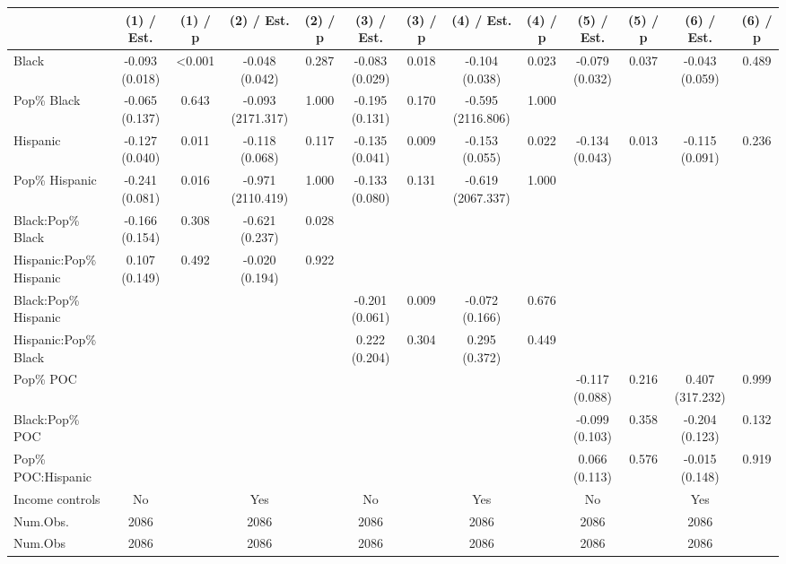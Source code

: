 
\begin{tabular}[t]{lcccccccccccc}
\toprule
  & (1) / Est. & (1) / p & (2) / Est. & (2) / p & (3) / Est. & (3) / p & (4) / Est. & (4) / p & (5) / Est. & (5) / p & (6) / Est. & (6) / p\\
\midrule
Black & -0.093 
(0.018) & <0.001 & -0.048 
(0.042) & 0.287 & -0.083 
(0.029) & 0.018 & -0.104 
(0.038) & 0.023 & -0.079 
(0.032) & 0.037 & -0.043 
(0.059) & 0.489\\
Pop\% Black & -0.065 
(0.137) & 0.643 & -0.093 
(2171.317) & 1.000 & -0.195 
(0.131) & 0.170 & -0.595 
(2116.806) & 1.000 &  &  &  & \\
Hispanic & -0.127 
(0.040) & 0.011 & -0.118 
(0.068) & 0.117 & -0.135 
(0.041) & 0.009 & -0.153 
(0.055) & 0.022 & -0.134 
(0.043) & 0.013 & -0.115 
(0.091) & 0.236\\
Pop\% Hispanic & -0.241 
(0.081) & 0.016 & -0.971 
(2110.419) & 1.000 & -0.133 
(0.080) & 0.131 & -0.619 
(2067.337) & 1.000 &  &  &  & \\
Black:Pop\% Black & -0.166 
(0.154) & 0.308 & -0.621 
(0.237) & 0.028 &  &  &  &  &  &  &  & \\
Hispanic:Pop\% Hispanic & 0.107 
(0.149) & 0.492 & -0.020 
(0.194) & 0.922 &  &  &  &  &  &  &  & \\
Black:Pop\% Hispanic &  &  &  &  & -0.201 
(0.061) & 0.009 & -0.072 
(0.166) & 0.676 &  &  &  & \\
Hispanic:Pop\% Black &  &  &  &  & 0.222 
(0.204) & 0.304 & 0.295 
(0.372) & 0.449 &  &  &  & \\
Pop\% POC &  &  &  &  &  &  &  &  & -0.117 
(0.088) & 0.216 & 0.407 
(317.232) & 0.999\\
Black:Pop\% POC &  &  &  &  &  &  &  &  & -0.099 
(0.103) & 0.358 & -0.204 
(0.123) & 0.132\\
Pop\% POC:Hispanic &  &  &  &  &  &  &  &  & 0.066 
(0.113) & 0.576 & -0.015 
(0.148) & 0.919\\
\midrule
Income controls & No &  & Yes &  & No &  & Yes &  & No &  & Yes & \\
Num.Obs. & 2086 &  & 2086 &  & 2086 &  & 2086 &  & 2086 &  & 2086 & \\
Num.Obs & 2086 &  & 2086 &  & 2086 &  & 2086 &  & 2086 &  & 2086 & \\
\bottomrule
\end{tabular}

